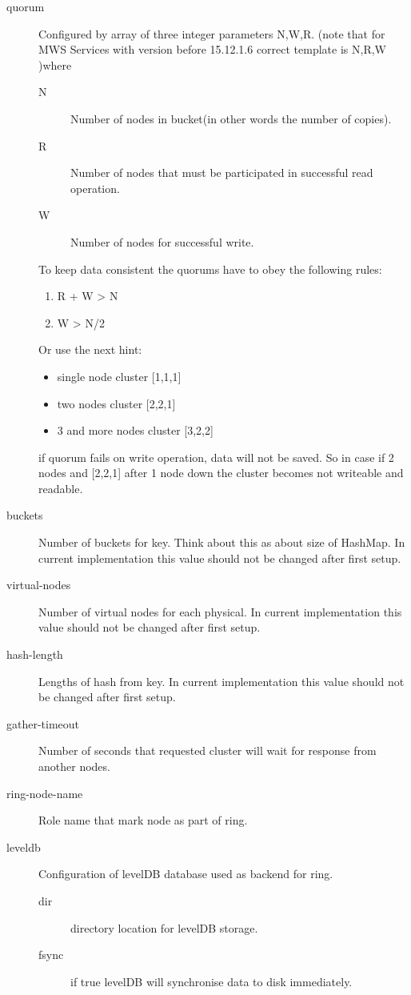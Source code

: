 \begin{description}
  \item[quorum] Configured by array of three integer parameters N,W,R. (note that for MWS Services with version before 15.12.1.6 correct template is N,R,W )where
  \begin{description}
    \item[N] Number of nodes in bucket(in other words the number of copies).
    \item[R] Number of nodes that must  be participated in successful read operation.
    \item[W] Number of nodes for successful write.
  \end{description}
  To keep data consistent the quorums have to obey the following rules:
  \begin{enumerate}
    \item R + W > N
    \item W > N/2
  \end{enumerate}
  Or use the next hint:
  \begin{itemize}
    \item single node cluster [1,1,1]
    \item two nodes cluster [2,2,1]
    \item 3 and more nodes cluster [3,2,2]
  \end{itemize}
  if quorum fails on write operation, data will not be saved. So in case if 2 nodes and [2,2,1] after 1 node down the cluster becomes not writeable and readable.
  \item[buckets] Number of buckets for key. Think about this as about size of HashMap. In current implementation this value should not be changed after first setup.
  \item[virtual-nodes] Number of virtual nodes for each physical. In current implementation this value should not be changed after first setup.
  \item[hash-length] Lengths of hash from key. In current implementation this value should not be changed after first setup.
  \item[gather-timeout] Number of seconds that requested cluster will wait for response from another nodes.
  \item[ring-node-name] Role name that mark node as part of ring.
  \item[leveldb] Configuration of levelDB database used as backend for ring.
  \begin{description}
    \item[dir] directory location for levelDB storage.
    \item[fsync] if true levelDB will synchronise data to disk immediately.
  \end{description}
\end{description}

